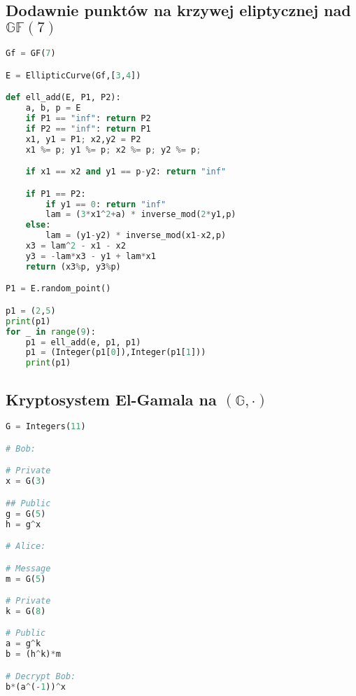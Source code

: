 \subsection*{Dodawnie punktów na krzywej eliptycznej nad $\mathbb{GF}(7)$}
\begin{lstlisting}[language=python, label=sage_2, caption=Dodawnie punktów na krzywej eliptycznej zdefiniowanej na GF(7)]
Gf = GF(7)

E = EllipticCurve(Gf,[3,4])

def ell_add(E, P1, P2):
    a, b, p = E
    if P1 == "inf": return P2
    if P2 == "inf": return P1
    x1, y1 = P1; x2,y2 = P2
    x1 %= p; y1 %= p; x2 %= p; y2 %= p;

    if x1 == x2 and y1 == p-y2: return "inf"

    if P1 == P2:
        if y1 == 0: return "inf"
        lam = (3*x1^2+a) * inverse_mod(2*y1,p)
    else:
        lam = (y1-y2) * inverse_mod(x1-x2,p)
    x3 = lam^2 - x1 - x2
    y3 = -lam*x3 - y1 + lam*x1
    return (x3%p, y3%p)

P1 = E.random_point()

p1 = (2,5)
print(p1)
for _ in range(9):
    p1 = ell_add(e, p1, p1)
    p1 = (Integer(p1[0]),Integer(p1[1]))
    print(p1)


\end{lstlisting}

\subsection*{Kryptosystem El-Gamala na $(\mathbb{G}, \cdot)$}
\begin{lstlisting}[language=python, label=sage_3, caption=Kryptosystem El-Gamala]
G = Integers(11)

# Bob:

# Private
x = G(3)

## Public
g = G(5)
h = g^x

# Alice:

# Message
m = G(5)

# Private
k = G(8)

# Public
a = g^k
b = (h^k)*m

# Decrypt Bob:
b*(a^(-1))^x
\end{lstlisting}

